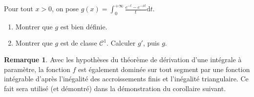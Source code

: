 \documentclass[french]{article}
\renewcommand{\d}{\text{d}}
\theoremstyle{plain}
\theoremstyle{definition}
\newtheorem*{rmq}{Remarque}
\theoremstyle{remark}
\begin{document}
\begin{exo}
	Pour tout $x>0$, on pose $g(x)=\displaystyle\int_{0}^{+\infty}\frac{e^{-t}-e^{-xt}}{t}\d t$.
	\begin{enumerate}
		\item Montrer que $g$ est bien définie.
		\item Montrer que $g$ est de classe $\mathcal{C}^1$. Calculer $g'$, puis $g$.
	\end{enumerate}
\end{exo}

\begin{rmq}
	Avec les hypothèses du théorème de dérivation d'une intégrale à paramètre, la fonction $f$ est également dominée sur tout segment par une fonction intégrable d'après l'inégalité des accroissements finis et l'inégalité triangulaire. Ce fait sera utilisé (et démontré) dans la démonstration du corollaire suivant.
\end{rmq}
\end{document}
